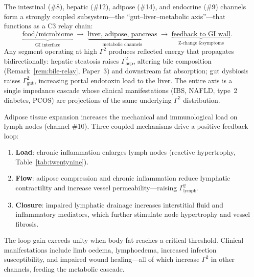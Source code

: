 \documentclass[aps,pre,twocolumn,superscriptaddress,floatfix]{revtex4-2}
\begin{document}
\begin{remark}
\label{rem:gut-liver-chain}
The intestinal (\#8), hepatic (\#12), adipose (\#14),
and endocrine (\#9) channels form a strongly coupled
subsystem---the ``gut--liver--metabolic axis''---that
functions as a C3 relay chain:
\[
  \underbrace{\text{food/microbiome}}_{\text{GI interface}}
  \;\to\;
  \underbrace{\text{liver, adipose, pancreas}}_{\text{metabolic channels}}
  \;\to\;
  \underbrace{\text{feedback to GI wall}}_{\text{Z-change \& symptoms}}.
\]
Any segment operating at high $\Gamma^2$
produces reflected energy that propagates bidirectionally:
hepatic steatosis raises $\Gamma_{\text{hep}}^2$,
altering bile composition (Remark~\ref{rem:bile-relay},
Paper~3) and downstream fat absorption;
gut dysbiosis raises $\Gamma_{\text{gut}}^2$,
increasing portal endotoxin load to the liver.
The entire axis is a single impedance cascade
whose clinical manifestations (IBS, NAFLD,
type~2 diabetes, PCOS) are projections of
the same underlying $\Gamma^2$ distribution.
\end{remark}

\begin{remark}
\label{rem:lymphatic-cascade}
Adipose tissue expansion increases the mechanical
and immunological load on lymph nodes
(channel \#10).
Three coupled mechanisms drive a positive-feedback
loop:
\begin{enumerate}
  \item \textbf{Load}: chronic inflammation enlarges
    lymph nodes (reactive hypertrophy, Table~\ref{tab:twentynine}).
  \item \textbf{Flow}: adipose compression and
    chronic inflammation reduce lymphatic contractility
    and increase vessel permeability---raising
    $\Gamma_{\text{lymph}}^2$.
  \item \textbf{Closure}: impaired lymphatic drainage
    increases interstitial fluid and inflammatory mediators,
    which further stimulate node hypertrophy
    and vessel fibrosis.
\end{enumerate}
The loop gain exceeds unity when body fat reaches
a critical threshold.
Clinical manifestations include limb oedema,
lymphoedema, increased infection susceptibility,
and impaired wound healing---all of which
increase $\Gamma^2$ in other channels,
feeding the metabolic cascade.
\end{remark}
\end{document}

